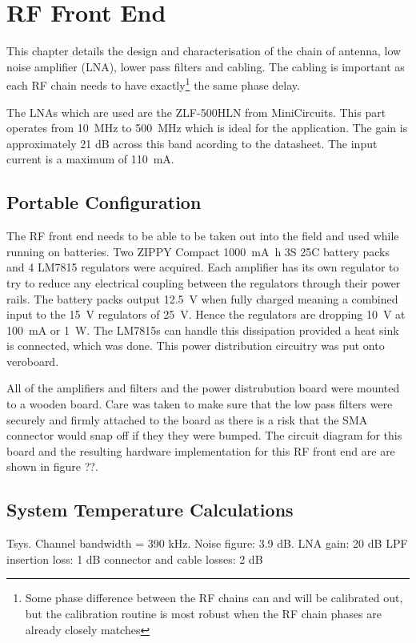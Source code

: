\chapter{RF Front End}
\label{ch:rf-front-end}

This chapter details the design and characterisation of the chain of antenna, low noise amplifier (LNA), lower pass filters and cabling. The cabling is important as each RF chain needs to have exactly\footnote{Some phase difference between the RF chains can and will be calibrated out, but the calibration routine is most robust when the RF chain phases are already closely matches} the same phase delay.

The LNAs which are used are the ZLF-500HLN from MiniCircuits. This part operates from \SI{10}{\mega\hertz} to \SI{500}{\mega\hertz} which is ideal for the application. The gain is approximately 21 dB across this band acording to the datasheet. The input current is a maximum of \SI{110}{\milli\ampere}.



\section{Portable Configuration}
The RF front end needs to be able to be taken out into the field and used while running on batteries.
Two ZIPPY Compact \SI{1000}{\milli\ampere\hour} 3S 25C battery packs and 4 LM7815 regulators were acquired. 
Each amplifier has its own regulator to try to reduce any electrical coupling between the regulators through their power rails.
The battery packs output \SI{12.5}{\volt} when fully charged meaning a combined input to the \SI{15}{\volt} regulators of \SI{25}{\volt}. Hence the regulators are dropping \SI{10}{\volt} at \SI{100}{\milli\ampere} or \SI{1}{\watt}.
The LM7815s can handle this dissipation provided a heat sink is connected, which was done.
This power distribution circuitry was put onto veroboard.

All of the amplifiers and filters and the power distrubution board were mounted to a wooden board.
Care was taken to make sure that the low pass filters were securely and firmly attached to the board as there is a risk that the SMA connector would snap off if they they were bumped. 
The circuit diagram for this board and the resulting hardware implementation for this RF front end are are shown in figure ??.

\section{System Temperature Calculations}
Tsys.
Channel bandwidth = 390 kHz. 
Noise figure: 3.9 dB. 
LNA gain: 20 dB
LPF insertion loss: 1 dB
connector and cable losses: 2 dB
